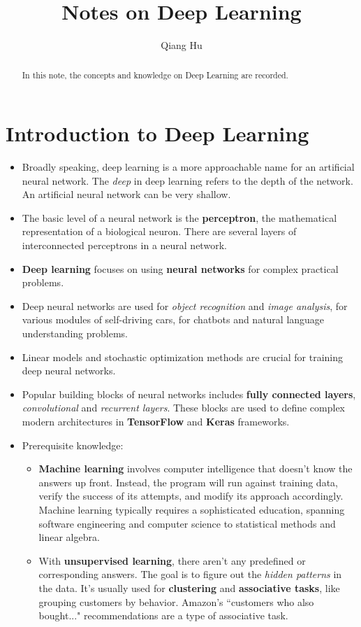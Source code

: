 \documentclass[]{article}
\title{Notes on Deep Learning}
\author{Qiang Hu}
\begin{document}
\maketitle

\begin{abstract}
In this note, the concepts and knowledge on Deep Learning are recorded. 
\end{abstract}

\section{Introduction to Deep Learning}
\begin{itemize}
	\item Broadly speaking, deep learning is a more approachable name for an artificial neural network. The \textit{deep} in deep learning refers to the depth of the network. An artificial neural network can be very shallow.
	\item The basic level of a neural network is the \textbf{perceptron}, the mathematical representation of a biological neuron. There are several layers of interconnected perceptrons in a neural network.
	\item \textbf{Deep learning} focuses on using \textbf{neural networks} for complex practical problems.
	\item Deep neural networks are used for \textit{object recognition} and \textit{image analysis}, for various modules of self-driving cars, for chatbots and natural language understanding problems.
	\item Linear models and stochastic optimization methods are crucial for training deep neural networks.
	\item Popular building blocks of neural networks includes \textbf{fully connected layers}, \textit{convolutional} and \textit{recurrent layers}. These blocks are used to define complex modern architectures in \textbf{TensorFlow} and \textbf{Keras} frameworks.
	\item Prerequisite knowledge:
	\begin{itemize}
		\item \textbf{Machine learning} involves computer intelligence that doesn't know the answers up front. Instead, the program will run against training data, verify the success of its attempts, and modify its approach accordingly. Machine learning typically requires a sophisticated education, spanning software engineering and computer science to statistical methods and linear algebra.
		\item With \textbf{unsupervised learning}, there aren't any predefined or corresponding answers. The goal is to figure out the \textit{hidden patterns} in the data. It's usually used for \textbf{clustering} and \textbf{associative tasks}, like grouping customers by behavior. Amazon's ``customers who also bought..." recommendations are a type of associative task.

\end{itemize}
\end{itemize}
\end{document}

